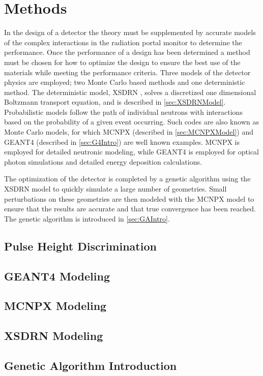 \chapter{Methods}
\label{chap:methods}
In the design of a detector the theory must be supplemented by accurate models of the complex interactions in the radiation portal monitor to determine the performance.
Once the performance of a design has been determined a method must be chosen for how to optimize the design to  ensure the best use of the materials while meeting the performance criteria.
Three models of the detector physics are employed; two Monte Carlo based methods and one deterministic method.
The deterministic model, XSDRN \cite{XSDRNPM_2011}, solves a discretized one dimensional Boltzmann transport equation, and is described in \autoref{sec:XSDRNModel}.
Probabilistic models follow the path of individual neutrons with interactions based on the probability of a given event occurring.
Such codes are also known as Monte Carlo models, for which MCNPX (described in \autoref{sec:MCNPXModel}) and GEANT4 (described in \autoref{sec:G4Intro}) are well known examples.
MCNPX is employed for detailed neutronic modeling, while GEANT4 is employed for optical photon simulations and detailed energy deposition calculations.

The optimization of the detector is completed by a genetic algorithm using the XSDRN model to quickly simulate a large number of geometries.
Small perturbations on these geometries are then modeled with the MCNPX model to ensure that the results are accurate and that true convergence has been reached.
The genetic algorithm is introduced in \autoref{sec:GAIntro}.

\section{Pulse Height Discrimination}
\label{sec:PulseHeightDiscrm}


\section{GEANT4 Modeling}
\label{sec:G4Intro}


\section{MCNPX Modeling}
\label{sec:MCNPXModel}


\section{XSDRN Modeling}
\label{sec:XSDRNModel}


\section{Genetic Algorithm Introduction}
\label{sec:GAIntro}

